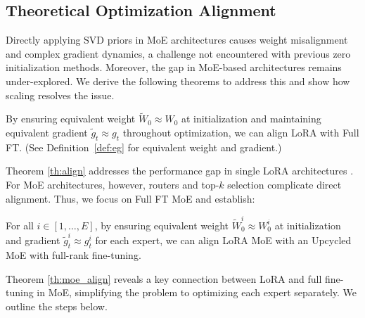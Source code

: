 \subsection{Theoretical Optimization Alignment}
Directly applying SVD priors in MoE architectures causes weight misalignment and complex gradient dynamics, a challenge not encountered with previous zero initialization methods. Moreover, the gap in MoE-based architectures remains under-explored. We derive the following theorems to address this and show how scaling resolves the issue.
\begin{theorem}\label{th:align}
By ensuring equivalent weight \( \tilde{W}_0 \approx W_0 \) at initialization and maintaining equivalent gradient \( \tilde{g}_t \approx g_t \) throughout optimization, we can align LoRA with Full FT. (See Definition~\ref{def:eg} for equivalent weight and gradient.)
\end{theorem}
Theorem \ref{th:align} addresses the performance gap in single LoRA architectures \cite{wanglora, wang2024loraprolowrankadaptersproperly}. For MoE architectures, however, routers and top-$k$ selection complicate direct alignment. Thus, we focus on Full FT MoE and establish:
\begin{theorem}\label{th:moe_align}
For all \( i \in [1, \dots, E] \), by ensuring equivalent weight \( \tilde{W}^i_0 \approx W^i_0 \) at initialization and gradient \( \tilde{g}^i_t \approx g^i_t \) for each expert, we can align LoRA MoE with an Upcycled MoE with full-rank fine-tuning. 
\end{theorem}
Theorem \ref{th:moe_align} reveals a key connection between LoRA and full fine-tuning in MoE, simplifying the problem to optimizing each expert separately. We outline the steps below.

